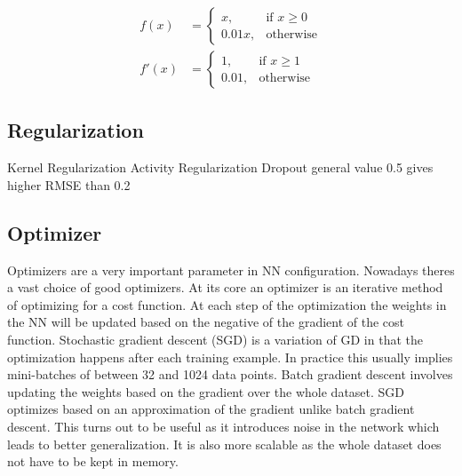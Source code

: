 \begin{equation}
    \label{eq:leakyrelu}
    \begin{aligned}
    f(x) &=
    \begin{cases}
        x, & \text{if } x\geq 0 \\
        0.01x, & \text{otherwise}
    \end{cases} \\
    f'(x) &=
    \begin{cases}
        1, & \text{if } x\geq 1 \\
        0.01, & \text{otherwise}
    \end{cases}
    \end{aligned}
\end{equation}



\begin{figure}[h!]
    \hfill
\end{figure}


\subsection{Regularization}
Kernel Regularization
Activity Regularization
Dropout general value 0.5 gives higher RMSE than 0.2

\subsection{Optimizer}
Optimizers are a very important parameter in NN configuration. Nowadays theres a vast choice of good optimizers. At its core an optimizer is an iterative method of optimizing for a cost function. At each step of the optimization the weights in the NN will be updated based on the negative of the gradient of the cost function. Stochastic gradient descent (SGD) is a variation of GD in that the optimization happens after each training example. In practice this usually implies mini-batches of between 32 and 1024 data points. Batch gradient descent involves updating the weights based on the gradient over the whole dataset. SGD optimizes based on an approximation of the gradient unlike batch gradient descent. This turns out to be useful as it introduces noise in the network which leads to better generalization. It is also more scalable as the whole dataset does not have to be kept in memory.

